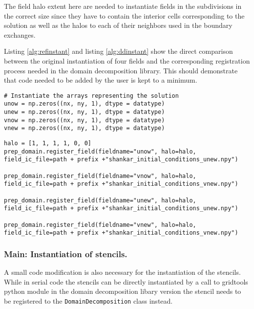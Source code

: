The field halo extent here are needed to instantiate fields in the subdivisions in the correct size since they have to contain the interior cells corresponding to the solution as well as the halos to each of their neighbors used in the boundary exchanges.

Listing \ref{alg:refinstant} and listing \ref{alg:ddinstant} show the direct comparison between the original instantiation of four fields and the corresponding registration process needed in the domain decomposition library.
This should demonstrate that code needed to be added by the user is kept to a minimum.

\begin{lstlisting}[caption={Example code for the original user field instantiation.},captionpos=b, label={alg:refinstant}]
# Instantiate the arrays representing the solution
unow = np.zeros((nx, ny, 1), dtype = datatype)
unew = np.zeros((nx, ny, 1), dtype = datatype)
vnow = np.zeros((nx, ny, 1), dtype = datatype)
vnew = np.zeros((nx, ny, 1), dtype = datatype)
\end{lstlisting} 

\begin{lstlisting}[caption={Example code for the same field instantiation using the domain decomposition library.},captionpos=b, label={alg:ddinstant}]
halo = [1, 1, 1, 1, 0, 0]
prep_domain.register_field(fieldname="unow", halo=halo, field_ic_file=path + prefix +"shankar_initial_conditions_unew.npy")

prep_domain.register_field(fieldname="vnow", halo=halo, field_ic_file=path + prefix +"shankar_initial_conditions_vnew.npy")

prep_domain.register_field(fieldname="unew", halo=halo, field_ic_file=path + prefix +"shankar_initial_conditions_unew.npy")

prep_domain.register_field(fieldname="vnew", halo=halo, field_ic_file=path + prefix +"shankar_initial_conditions_vnew.npy")
\end{lstlisting}

\subsubsection{Main: Instantiation of stencils.}
A small code modification is also necessary for the instantiation of the stencils.
While in serial code the stencils can be directly instantiated by a call to gridtools python module in the domain decomposition libary version the stencil needs to be registered to the \texttt{DomainDecomposition} class instead.

